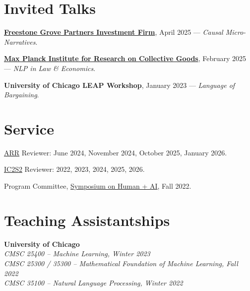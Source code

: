 \documentclass[11pt,letterpaper]{article}
\begin{document}
\section*{Invited Talks}
\begin{cvitems}

\item \href{https://fgrovep.com}{\textbf{Freestone Grove Partners Investment Firm}}, April 2025 --- \textit{Causal Micro-Narratives}.


\item \href{https://www.coll.mpg.de}{\textbf{Max Planck Institute for Research on Collective Goods}}, February 2025 --- \textit{NLP in Law \& Economics}.


\item \textbf{University of Chicago LEAP Workshop}, January 2023 --- \textit{Language of Bargaining}.
    
\end{cvitems}

\section*{Service}

\begin{cvitems}
    \item \href{https://aclrollingreview.org}{ARR} Reviewer: June 2024, November 2024, October 2025, January 2026.
    \item \href{https://ic2s2-2026.org}{IC2S2} Reviewer: 2022, 2023, 2024, 2025, 2026.
    \item Program Committee, \href{https://datascience.uchicago.edu/events/human-ai-conference/}{Symposium on Human + AI}, Fall 2022.
\end{cvitems}

\section*{Teaching Assistantships}

\textbf{University of Chicago}\\
\hspace*{2em}\textit{CMSC 25400 -- Machine Learning, Winter 2023}\\
\hspace*{2em}\textit{CMSC 25300 / 35300 -- Mathematical Foundation of Machine Learning, Fall 2022}\\
\hspace*{2em}\textit{CMSC 35100 -- Natural Language Processing, Winter 2022}
\end{document}
